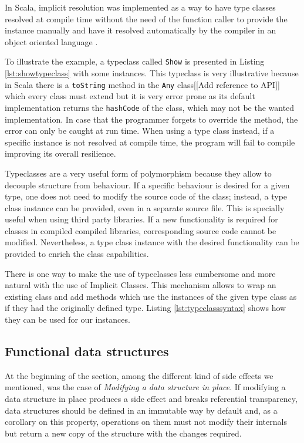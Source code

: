 \documentclass[../main.tex]{subfiles}
\begin{document}
In Scala, implicit resolution was implemented as a way to have type classes
resolved at compile time without the need of the function caller to provide the
instance manually and have it resolved automatically by the compiler in an
object oriented language \autocite{Oliveira2010TypeImplicits}.

To illustrate the example, a typeclass called \texttt{Show} is presented in
Listing \ref{lst:showtypeclass} with some instances. This typeclass is very
illustrative because in Scala there is a \texttt{toString} method in the
\texttt{Any} class[[Add reference to API]] which every class must extend but it
is very error prone as its default implementation returns the \texttt{hashCode} of the
class, which may not be the wanted implementation. In case that the programmer
forgets to override the method, the error can only be caught at run time. When
using a type class instead, if a specific instance is not resolved at compile time, the
program will fail to compile improving its overall resilience.



Typeclasses are a very useful form of polymorphism because they allow to decouple structure from
behaviour. If a specific behaviour is desired for a given type, one does not need
to modify the source code of the class; instead, a type class instance can be provided, even
in a separate source file. This is specially useful when using third party
libraries. If a new functionality is required for classes in compiled compiled libraries,
corresponding source code cannot be modified. Nevertheless, a type class instance
with the desired functionality can be provided to enrich the class capabilities.

There is one way to make the use of typeclasses less cumbersome and more natural
with the use of Implicit Classes. This mechanism allows to wrap an existing
class and add methods which use the instances of the given type class as if they
had the originally defined type. Listing \ref{lst:typeclasssyntax}
shows how they can be used for our instances.


\subsection{Functional data structures} At the beginning of the section, among
the different kind of side effects we mentioned, was the case of \textit{Modifying a
data structure in place}. If modifying a data structure in place produces a side
effect and breaks referential transparency, data structures should be defined in an
immutable way by default and, as a corollary on this property, operations on them
must not modify their internals but return a new copy of the structure with the changes required.
\end{document}
